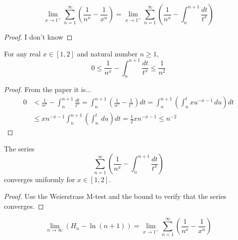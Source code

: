 \begin{lemma}
  \label{thm:eulerMascheroni_antisymm_equiv}
  $$
    \lim_{x \to 1^+}{\sum_{n=1}^{\infty}{\left( \frac{1}{n^x} - \frac{1}{x^n} \right)}} = 
      \lim_{x \to 1^+}{\sum_{n=1}^{\infty}{\left(\frac{1}{n^x} - \int_n^{n+1}{\frac{dt}{t^x}}\right)}}
  $$
\end{lemma}

\begin{proof}
  I don't know
\end{proof}

\begin{lemma}
  \label{thm:eulerMascheroni_int_sum_bound}
  \leanok
  For any real $x \in [1, 2]$ and natural number $n \ge 1$,
  $$
    0 \le \frac{1}{n^x} - \int_n^{n+1}{\frac{dt}{t^x}} \le \frac{1}{n^2}
  $$
\end{lemma}

\begin{proof}
  \leanok
  From the paper it is...
  $$
    \begin{aligned}
    0 &< \frac{1}{n^x} - \int_n^{n+1} \frac{dt}{t^x} = \int_n^{n+1} \left( \frac{1}{n^x} - \frac{1}{t^x} \right) dt = \int_n^{n+1} \left( \int_n^t x u^{-x-1} \, du \right) dt \\
    &\leq x n^{-x-1} \int_n^{n+1} \left( \int_n^t \, du \right) dt = \frac{1}{2} x n^{-x-1} \leq n^{-2}
    \end{aligned}
  $$
\end{proof}

\begin{lemma}
  \label{thm:eulerMascheroni_uniform_conv}
  \leanok
  The series 
  $$
    \sum_{n=1}^{\infty}{\left(\frac{1}{n^x} - \int_n^{n+1}{\frac{dt}{t^x}}\right)}
  $$
  converges uniformly for $x \in [1, 2]$.
\end{lemma}

\begin{proof}
  \leanok
  Use the Weierstrass M-test and the bound to verify that the series converges.
\end{proof}

\begin{lemma}
  \label{thm:eulerMascheroni_antisymm_equiv_limit}
  $$
    \lim_{n \to \infty}{\left( H_n - \ln(n+1) \right)} = \lim_{x \to 1^+}{\sum_{n=1}^{\infty}{\left( \frac{1}{n^x} - \frac{1}{x^n} \right)}}
  $$
\end{lemma}

